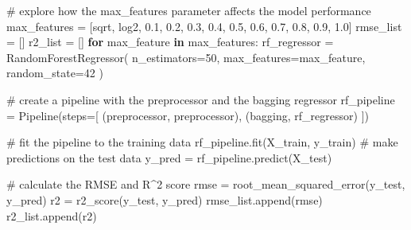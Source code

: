 \documentclass[
  letterpaper,
  DIV=11,
  numbers=noendperiod]{scrreprt}
\newenvironment{Shaded}{\begin{snugshade}}{\end{snugshade}}
\newcommand{\CommentTok}[1]{\textcolor[rgb]{0.37,0.37,0.37}{#1}}
\newcommand{\ControlFlowTok}[1]{\textcolor[rgb]{0.00,0.23,0.31}{\textbf{#1}}}
\newcommand{\DecValTok}[1]{\textcolor[rgb]{0.68,0.00,0.00}{#1}}
\newcommand{\FloatTok}[1]{\textcolor[rgb]{0.68,0.00,0.00}{#1}}
\newcommand{\KeywordTok}[1]{\textcolor[rgb]{0.00,0.23,0.31}{\textbf{#1}}}
\newcommand{\NormalTok}[1]{\textcolor[rgb]{0.00,0.23,0.31}{#1}}
\newcommand{\OperatorTok}[1]{\textcolor[rgb]{0.37,0.37,0.37}{#1}}
\newcommand{\StringTok}[1]{\textcolor[rgb]{0.13,0.47,0.30}{#1}}
\begin{document}
\begin{Shaded}
\begin{Highlighting}[]
\CommentTok{\# explore how the max\_features parameter affects the model performance}
\NormalTok{max\_features }\OperatorTok{=}\NormalTok{ [}\StringTok{\textquotesingle{}sqrt\textquotesingle{}}\NormalTok{, }\StringTok{\textquotesingle{}log2\textquotesingle{}}\NormalTok{, }\FloatTok{0.1}\NormalTok{, }\FloatTok{0.2}\NormalTok{, }\FloatTok{0.3}\NormalTok{, }\FloatTok{0.4}\NormalTok{, }\FloatTok{0.5}\NormalTok{, }\FloatTok{0.6}\NormalTok{, }\FloatTok{0.7}\NormalTok{, }\FloatTok{0.8}\NormalTok{, }\FloatTok{0.9}\NormalTok{, }\FloatTok{1.0}\NormalTok{]}
\NormalTok{rmse\_list }\OperatorTok{=}\NormalTok{ []}
\NormalTok{r2\_list }\OperatorTok{=}\NormalTok{ []}
\ControlFlowTok{for}\NormalTok{ max\_feature }\KeywordTok{in}\NormalTok{ max\_features:}
\NormalTok{    rf\_regressor }\OperatorTok{=}\NormalTok{ RandomForestRegressor(}
\NormalTok{        n\_estimators}\OperatorTok{=}\DecValTok{50}\NormalTok{,}
\NormalTok{        max\_features}\OperatorTok{=}\NormalTok{max\_feature,}
\NormalTok{        random\_state}\OperatorTok{=}\DecValTok{42}
\NormalTok{    )}

    \CommentTok{\# create a pipeline with the preprocessor and the bagging regressor}
\NormalTok{    rf\_pipeline }\OperatorTok{=}\NormalTok{ Pipeline(steps}\OperatorTok{=}\NormalTok{[}
\NormalTok{        (}\StringTok{\textquotesingle{}preprocessor\textquotesingle{}}\NormalTok{, preprocessor),}
\NormalTok{        (}\StringTok{\textquotesingle{}bagging\textquotesingle{}}\NormalTok{, rf\_regressor)}
\NormalTok{    ])}

    \CommentTok{\# fit the pipeline to the training data}
\NormalTok{    rf\_pipeline.fit(X\_train, y\_train)}
    \CommentTok{\# make predictions on the test data}
\NormalTok{    y\_pred }\OperatorTok{=}\NormalTok{ rf\_pipeline.predict(X\_test)}

    \CommentTok{\# calculate the RMSE and R\^{}2 score}
\NormalTok{    rmse }\OperatorTok{=}\NormalTok{ root\_mean\_squared\_error(y\_test, y\_pred)}
\NormalTok{    r2 }\OperatorTok{=}\NormalTok{ r2\_score(y\_test, y\_pred)}
\NormalTok{    rmse\_list.append(rmse)}
\NormalTok{    r2\_list.append(r2)}
\end{Highlighting}
\end{Shaded}
\end{document}
